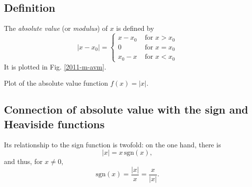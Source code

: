\subsection{Definition}
The {\em absolute value} (or {\em modulus})
of $x$ is defined by
\begin{equation}
\left|
x-x_0\right|
=
\left\{
\begin{array}{ll}
x-x_0&\textrm{ for } x > x_0\\
0&\textrm{ for } x = x_0\\
x_0-x&\textrm{ for } x < x_0
\end{array}
\right.
\label{2011-m-di-avm}
\end{equation}
It is plotted in Fig. \ref{2011-m-avm}.
\begin{marginfigure}
\begin{center}
\caption{Plot of the absolute value function $f(x)=\left|x\right|$.}
\label{2011-m-avm}
\end{center}
\end{marginfigure}

\subsection{Connection of absolute value with the sign and Heaviside functions}

Its relationship to the sign function is twofold:
on the one hand, there is
 \begin{equation}
 \left|x\right| = x \,\textrm{sgn} (x),
 \end{equation}
and thus, for $x\neq 0$,
 \begin{equation}
\textrm{sgn} (x)  = \frac{\left|x\right|}{x} = \frac{x}{\left|x\right|}.
 \end{equation}

